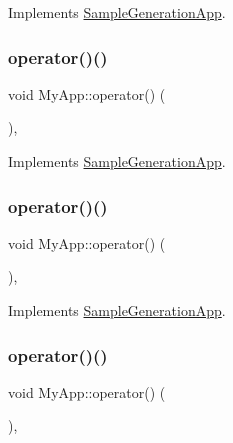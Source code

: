 Implements \hyperlink{class_sample_generation_app_a351fe6cfe624aeeee9ba4fb04d80ca0f}{Sample\+Generation\+App}.

\mbox{\label{class_my_app_a376d7e3ddb7ab21223f29a7263b6fb14}} 
\subsubsection{\texorpdfstring{operator()()}{operator()()}\hspace{0.1cm}{\footnotesize\ttfamily [3/8]}}
{\footnotesize\ttfamily void My\+App\+::operator() (\begin{DoxyParamCaption}{ }\end{DoxyParamCaption})\hspace{0.3cm}{\ttfamily [inline]}, {\ttfamily [virtual]}}



Implements \hyperlink{class_sample_generation_app_a351fe6cfe624aeeee9ba4fb04d80ca0f}{Sample\+Generation\+App}.

\mbox{\label{class_my_app_a376d7e3ddb7ab21223f29a7263b6fb14}} 
\subsubsection{\texorpdfstring{operator()()}{operator()()}\hspace{0.1cm}{\footnotesize\ttfamily [4/8]}}
{\footnotesize\ttfamily void My\+App\+::operator() (\begin{DoxyParamCaption}{ }\end{DoxyParamCaption})\hspace{0.3cm}{\ttfamily [inline]}, {\ttfamily [virtual]}}



Implements \hyperlink{class_sample_generation_app_a351fe6cfe624aeeee9ba4fb04d80ca0f}{Sample\+Generation\+App}.

\mbox{\label{class_my_app_a376d7e3ddb7ab21223f29a7263b6fb14}} 
\subsubsection{\texorpdfstring{operator()()}{operator()()}\hspace{0.1cm}{\footnotesize\ttfamily [5/8]}}
{\footnotesize\ttfamily void My\+App\+::operator() (\begin{DoxyParamCaption}{ }\end{DoxyParamCaption})\hspace{0.3cm}{\ttfamily [inline]}, {\ttfamily [virtual]}}



